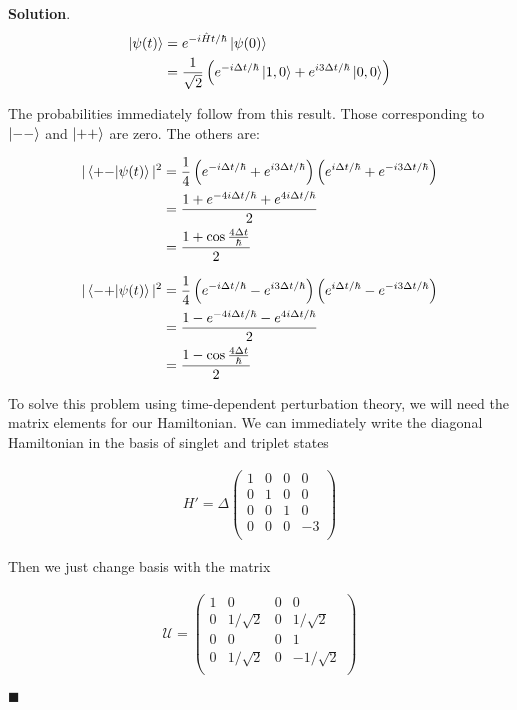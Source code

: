 \documentclass[12pt]{article}
\theoremstyle{definition}
\newenvironment{s}{%
        \begin{trivlist} \item \textbf{Solution}. }{%
            \hspace*{\fill} $\blacksquare$\end{trivlist}}%
\begin{document}
{\begin{s}
\begin{align*}
\ket{\psi(t)} &= e^{-i\hat{H}t/\hbar}\ket{\psi(0)}\\
&= \frac{1}{\sqrt{2}}\left(e^{-i\Delta t/\hbar}\ket{1,0} + e^{i3\Delta t/\hbar}\ket{0,0}\right)
\end{align*}

The probabilities immediately follow from this result. Those corresponding to $\ket{--}$ and $\ket{++}$ are zero. The others are:

\begin{align*}
|\bra{+-}\ket{\psi(t)}|^{2} &= \frac{1}{4}\left(e^{-i\Delta t/\hbar} + e^{i3\Delta t/\hbar}\right)\left(e^{i\Delta t/\hbar} + e^{-i3\Delta t/\hbar}\right)\\
&= \frac{1+ e^{-4i\Delta t / \hbar} + e^{4i\Delta t / \hbar}}{2}\\
&= \frac{1+\cos\frac{4\Delta t}{\hbar}}{2}
\end{align*}

\begin{align*}
|\bra{-+}\ket{\psi(t)}|^{2} &= \frac{1}{4}\left(e^{-i\Delta t/\hbar} - e^{i3\Delta t/\hbar}\right)\left(e^{i\Delta t/\hbar} - e^{-i3\Delta t/\hbar}\right)\\
&= \frac{1 - e^{-4i\Delta t / \hbar} - e^{4i\Delta t / \hbar}}{2}\\
&= \frac{1-\cos\frac{4\Delta t}{\hbar}}{2}
\end{align*}


To solve this problem using time-dependent perturbation theory, we will need the matrix elements for our Hamiltonian. We can immediately write the diagonal Hamiltonian in the basis of singlet and triplet states

\begin{align*}
H' =
\Delta\begin{pmatrix}
1 & 0 & 0 & 0\\
0 & 1 & 0 & 0\\
0 & 0 & 1 & 0\\
0 & 0 & 0 & -3\\
\end{pmatrix}
\end{align*}

Then we just change basis with the matrix

\begin{align*}
\mathcal{U} =
\begin{pmatrix}
1 & 0 & 0 & 0\\
0 & 1/\sqrt{2} & 0 & 1/\sqrt{2}\\
0 & 0 & 0 & 1\\
0 & 1/\sqrt{2} & 0 & -1/\sqrt{2}\\
\end{pmatrix}
\end{align*}


\end{s}}
\end{document}
